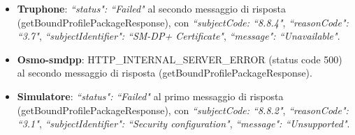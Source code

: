 \documentclass[10pt, oneside]{book}
\begin{document}
\begin{itemize}
\item \textbf{Truphone}: \textit{``status": ``Failed"} al secondo messaggio di risposta (getBoundProfilePackageResponse), con \textit{``subjectCode: ``8.8.4"}, \textit{``reasonCode": ``3.7"}, \textit{``subjectIdentifier": ``SM-DP+ Certificate"}, \textit{``message": ``Unavailable"}.
\item \textbf{Osmo-smdpp}: HTTP\_INTERNAL\_SERVER\_ERROR (status code 500) al secondo messaggio di risposta (getBoundProfilePackageResponse).
\item \textbf{Simulatore}: \textit{``status": ``Failed"} al primo messaggio di risposta (getBoundProfilePackageResponse), con \textit{``subjectCode: ``8.8.2"}, \textit{``reasonCode": ``3.1"}, \textit{``subjectIdentifier": ``Security configuration"}, \textit{``message": ``Unsupported"}.
\end{itemize}
\end{document}
